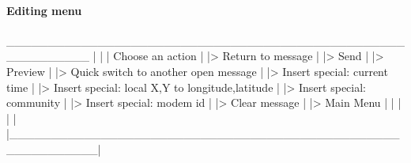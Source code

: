 \documentclass[11pt, letterpaper, oneside]{memoir}
\begin{document}
\paragraph{Editing menu}
\begin{boxedverbatim}
        __________________________________________________________
       |                                                          |
       |                     Choose an action                     |
       |> Return to message                                       |
       |> Send                                                    |
       |> Preview                                                 |
       |> Quick switch to another open message                    |
       |> Insert special: current time                            |
       |> Insert special: local X,Y to longitude,latitude         |
       |> Insert special: community                               |
       |> Insert special: modem id                                |
       |> Clear message                                           |
       |> Main Menu                                               |
       |                                                          |
       |                                                          |
       |__________________________________________________________|
\end{boxedverbatim}
\resetbvlinenumber
\end{document}
